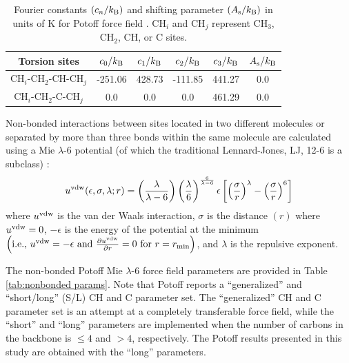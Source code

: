 \documentclass[preprint,review,12pt]{elsarticle}
\begin{document}
	\begin{table}[h!]
		\caption{Fourier constants $(c_n/k_{\rm B})$ and shifting parameter $(A_{\rm s}/k_{\rm B})$ in units of K for Potoff force field  \cite{Martin1999,Potoff_branched}. CH$_i$ and CH$_j$ represent CH$_3$, CH$_2$, CH, or C sites.} \label{tab:torsions}
		\begin{center}
			\begin{tabular}{|c|c|c|c|c|c|}
				\hline
				Torsion sites & $c_0/k_{\rm B}$ & $c_1/k_{\rm B}$ & $c_2/k_{\rm B}$ & $c_3/k_{\rm B}$ & $A_{\rm s}/k_{\rm B}$ \\ \hline
				CH$_i$-CH$_2$-CH-CH$_j$ & -251.06 & 428.73 & -111.85 & 441.27 & 0.0 \\
				CH$_i$-CH$_2$-C-CH$_j$ & 0.0 & 0.0 & 0.0 & 461.29 & 0.0 \\
				\hline
			\end{tabular}
		\end{center} 
	\end{table}
	
	Non-bonded interactions between sites located in two different molecules or separated by more than three bonds within the same molecule are calculated using a Mie $\lambda$-6 potential (of which the traditional Lennard-Jones, LJ, 12-6 is a subclass) \cite{Herdes2015}:
	\begin{equation} \label{eq:Mie}
	u^{\rm vdw}(\epsilon,\sigma,\lambda;r) = \left(\frac{\lambda}{\lambda - 6}\right)\left(\frac{\lambda}{6}\right)^{\frac{6}{\lambda - 6}} \epsilon \left[\left(\frac{\sigma}{r}\right)^{\lambda} - \left(\frac{\sigma}{r}\right)^6\right]
	\end{equation} 
	where $u^{\rm vdw}$ is the van der Waals interaction, $\sigma$ is the distance $(r)$ where $u^{\rm vdw} = 0$, $-\epsilon$ is the energy of the potential at the minimum $\left(\text{i.e., }u^{\rm vdw} = -\epsilon \text{ and } \frac{\partial u^{\rm vdw}}{\partial r} = 0 \text{ for } r=r_{\rm min} \right)$, and $\lambda$ is the repulsive exponent. 
	
	The non-bonded Potoff Mie $\lambda$-6 force field parameters are provided in Table \ref{tab:nonbonded params}. Note that Potoff reports a ``generalized'' and ``short/long'' (S/L) CH and C parameter set. The ``generalized'' CH and C parameter set is an attempt at a completely transferable force field, while the ``short'' and ``long'' parameters are implemented when the number of carbons in the backbone is $\le 4$ and $> 4$, respectively. The Potoff results presented in this study are obtained with the ``long'' parameters.
	
\end{document}
